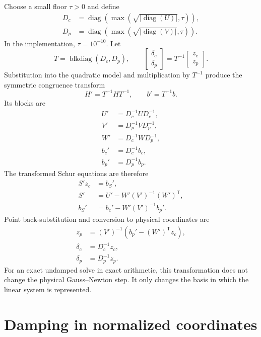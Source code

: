 \documentclass[11pt]{article}
\begin{document}
Choose a small floor $\tau>0$ and define
\begin{align}
  D_c &= \operatorname{diag}\left(
    \max\left(\sqrt{\left|\operatorname{diag}(U)\right|},\tau\right)
  \right), \\
  D_p &= \operatorname{diag}\left(
    \max\left(\sqrt{\left|\operatorname{diag}(V)\right|},\tau\right)
  \right).
\end{align}
In the implementation, $\tau=10^{-10}$.  Let
\begin{equation}
  T = \operatorname{blkdiag}(D_c,D_p),
  \qquad
  \begin{bmatrix}\delta_c\\\delta_p\end{bmatrix}
  = T^{-1}
  \begin{bmatrix}z_c\\z_p\end{bmatrix}.
\end{equation}
Substitution into the quadratic model and multiplication by $T^{-1}$ produce
the symmetric congruence transform
\begin{equation}
  H' = T^{-1}HT^{-1},
  \qquad
  b' = T^{-1}b.
\end{equation}
Its blocks are
\begin{align}
  U' &= D_c^{-1}UD_c^{-1}, \\
  V' &= D_p^{-1}VD_p^{-1}, \\
  W' &= D_c^{-1}WD_p^{-1}, \\
  b_c' &= D_c^{-1}b_c, \\
  b_p' &= D_p^{-1}b_p.
\end{align}
The transformed Schur equations are therefore
\begin{align}
  S'z_c &= b_S', \\
  S' &= U'-W'(V')^{-1}(W')^{\mathsf T}, \\
  b_S' &= b_c'-W'(V')^{-1}b_p'.
\end{align}
Point back-substitution and conversion to physical coordinates are
\begin{align}
  z_p &= (V')^{-1}\left(b_p'-(W')^{\mathsf T}z_c\right), \\
  \delta_c &= D_c^{-1}z_c, \\
  \delta_p &= D_p^{-1}z_p.
\end{align}
For an exact undamped solve in exact arithmetic, this transformation does not
change the physical Gauss--Newton step.  It only changes the basis in which the
linear system is represented.

\section{Damping in normalized coordinates}
\end{document}
